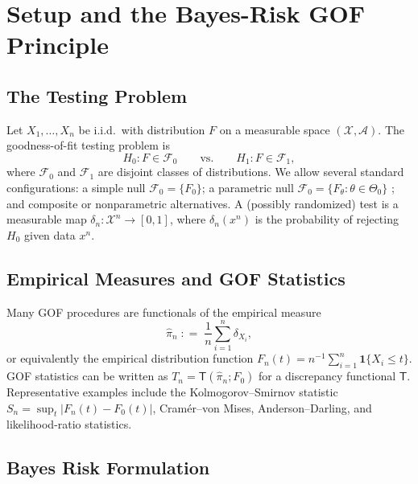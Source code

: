 \documentclass[11pt]{article}
\newcommand{\defeq}{\mathrel{\mathop:}=}
\newcommand{\calX}{\mathcal{X}}
\newcommand{\calA}{\mathcal{A}}
\newcommand{\calF}{\mathcal{F}}
\newcommand{\1}{\mathbf{1}}
\theoremstyle{plain}
\theoremstyle{definition}
\theoremstyle{remark}
\begin{document}
\section{Setup and the Bayes-Risk GOF Principle}
\label{sec:setup}

\subsection{The Testing Problem}

Let $X_1,\ldots,X_n$ be i.i.d.\ with distribution $F$ on a measurable space $(\calX,\calA)$. The goodness-of-fit testing problem is
\begin{equation}\label{eq:testing-problem}
H_0: F \in \calF_0
\qquad \text{vs.} \qquad
H_1: F \in \calF_1,
\end{equation}
where $\calF_0$ and $\calF_1$ are disjoint classes of distributions.
We allow several standard configurations: a simple null $\calF_0=\{F_0\}$; a parametric null $\calF_0=\{F_\theta:\theta\in\Theta_0\}$ \citep[see][for consistency under growing parameter spaces]{KieferWolfowitz1956}; and composite or nonparametric alternatives.
A (possibly randomized) test is a measurable map $\delta_n:\calX^n\to[0,1]$, where $\delta_n(x^n)$ is the probability of rejecting $H_0$ given data $x^n$.

\subsection{Empirical Measures and GOF Statistics}\label{subsec:empirical}

Many GOF procedures are functionals of the empirical measure
\begin{equation}\label{eq:empirical-measure}
\hat{\pi}_n \;\defeq\; \frac{1}{n}\sum_{i=1}^n \delta_{X_i},
\end{equation}
or equivalently the empirical distribution function $F_n(t) = n^{-1}\sum_{i=1}^n \1\{X_i\le t\}$.
GOF statistics can be written as $T_n=\mathsf{T}(\hat{\pi}_n;F_0)$ for a discrepancy functional $\mathsf{T}$.
Representative examples include the Kolmogorov--Smirnov statistic $S_n=\sup_t |F_n(t)-F_0(t)|$, Cram\'er--von Mises, Anderson--Darling, and likelihood-ratio statistics.

\subsection{Bayes Risk Formulation}
\end{document}
